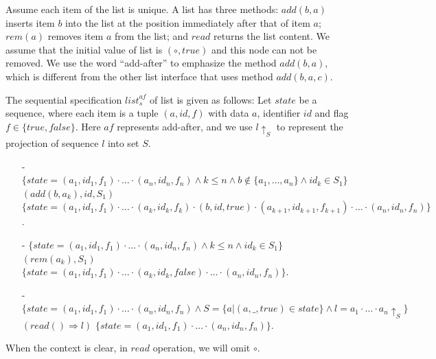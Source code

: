 \begin{example}
\label{definition:sequential specification of list with add-after interface}
Assume each item of the list is unique. A list has three methods: $\mathit{add}(b,a)$ inserts item $b$ into the list at the position immediately after that of item $a$; $\mathit{rem}(a)$ removes item $a$ from the list; and $\mathit{read}$ returns the list content. We assume that the initial value of list is $(\circ,\mathit{true})$ and this node can not be removed. We use the word ``add-after'' to emphasize the method $\mathit{add}(b,a)$, which is different from the other list interface that uses method $\mathit{add}(b,a,c)$.

The sequential specification $\mathit{list}_s^{\mathit{af}}$ of list is given as follows: Let $\mathit{state}$ be a sequence, where each item is a tuple $(a,\mathit{id},f)$ with data $a$, identifier $\mathit{id}$ and flag $f \in \{ \mathit{true},\mathit{false} \}$. Here $\mathit{af}$ represents add-after, and we use $l \uparrow_{S}$ to represent the projection of sequence $l$ into set $S$.
\begin{itemize}
\setlength{\itemsep}{0.5pt}
\item[-] $\{ \mathit{state} = (a_1,\mathit{id}_1,f_1) \cdot \ldots \cdot (a_n,\mathit{id}_n,f_n) \wedge k \leq n \wedge b \notin \{ a_1, \ldots, a_n \} \wedge \mathit{id}_k \in S_1 \}$ $(add(b,a_k),\mathit{id},S_1)$ $\{ \mathit{state} = (a_1,\mathit{id}_1,f_1) \cdot \ldots \cdot (a_k,\mathit{id}_k,f_k) \cdot (b,\mathit{id},\mathit{true}) \cdot (a_{k+1},\mathit{id}_{k+1},f_{k+1}) \cdot \ldots \cdot (a_n,\mathit{id}_n,f_n) \}$.
\item[-] $\{ \mathit{state} = (a_1,\mathit{id}_1,f_1) \cdot \ldots \cdot (a_n,\mathit{id}_n,f_n) \wedge k \leq n \wedge \mathit{id}_k \in S_1 \}$ $(rem(a_k),S_1)$ $\{ \mathit{state} = (a_1,\mathit{id}_1,f_1) \cdot \ldots \cdot (a_k,\mathit{id}_k,\mathit{false}) \cdot \ldots \cdot (a_n,\mathit{id}_n,f_n) \}$.
\item[-] $\{ \mathit{state} = (a_1,\mathit{id}_1,f_1) \cdot \ldots \cdot (a_n,\mathit{id}_n,f_n) \wedge S = \{ a \vert (a,\_,\mathit{true}) \in \mathit{state} \} \wedge l = a_1 \cdot \ldots \cdot a_n \uparrow_{S} \}$ $(read() \Rightarrow l)$ $\{ \mathit{state} = (a_1,\mathit{id}_1,f_1) \cdot \ldots \cdot (a_n,\mathit{id}_n,f_n) \}$.
\end{itemize}
When the context is clear, in $\mathit{read}$ operation, we will omit $\circ$.
\end{example}


